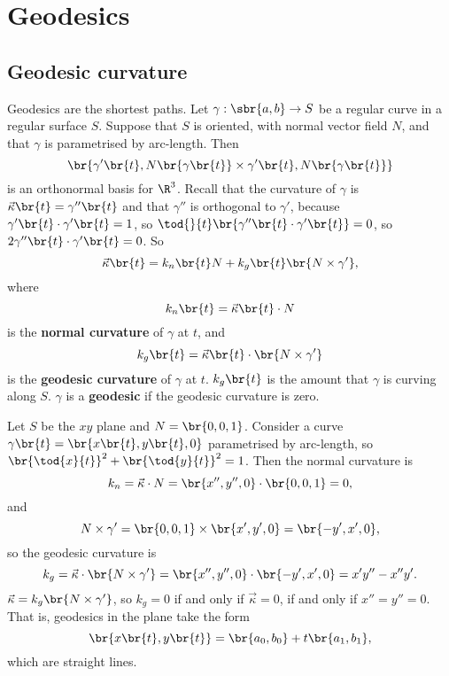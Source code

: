\pagebreak

\section{Geodesics}

\subsection{Geodesic curvature}

Geodesics are the shortest paths. Let $ \gamma : \sbr{a, b} \to S $ be a regular curve in a regular surface $ S $. Suppose that $ S $ is oriented, with normal vector field $ N $, and that $ \gamma $ is parametrised by arc-length. Then
$$ \br{\gamma'\br{t}, N\br{\gamma\br{t}} \times \gamma'\br{t}, N\br{\gamma\br{t}}} $$
is an orthonormal basis for $ \R^3 $. Recall that the curvature of $ \gamma $ is $ \vec{\kappa}\br{t} = \gamma''\br{t} $ and that $ \gamma'' $ is orthogonal to $ \gamma' $, because $ \gamma'\br{t} \cdot \gamma'\br{t} = 1 $, so $ \tod{}{t}\br{\gamma''\br{t} \cdot \gamma'\br{t}} = 0 $, so $ 2\gamma''\br{t} \cdot \gamma'\br{t} = 0 $. So
$$ \vec{\kappa}\br{t} = k_n\br{t}N + k_g\br{t}\br{N \times \gamma'}, $$
where
$$ k_n\br{t} = \vec{\kappa}\br{t} \cdot N $$
is the \textbf{normal curvature} of $ \gamma $ at $ t $, and
$$ k_g\br{t} = \vec{\kappa}\br{t} \cdot \br{N \times \gamma'} $$
is the \textbf{geodesic curvature} of $ \gamma $ at $ t $. $ k_g\br{t} $ is the amount that $ \gamma $ is curving along $ S $. $ \gamma $ is a \textbf{geodesic} if the geodesic curvature is zero.


\begin{example*}
Let $ S $ be the $ xy $ plane and $ N = \br{0, 0, 1} $. Consider a curve $ \gamma\br{t} = \br{x\br{t}, y\br{t}, 0} $ parametrised by arc-length, so $ \br{\tod{x}{t}}^2 + \br{\tod{y}{t}}^2 = 1 $. Then the normal curvature is
$$ k_n = \vec{\kappa} \cdot N = \br{x'', y'', 0} \cdot \br{0, 0, 1} = 0, $$
and
$$ N \times \gamma' = \br{0, 0, 1} \times \br{x', y', 0} = \br{-y', x', 0}, $$
so the geodesic curvature is
$$ k_g = \vec{\kappa} \cdot \br{N \times \gamma'} = \br{x'', y'', 0} \cdot \br{-y', x', 0} = x'y'' - x''y'. $$
$ \vec{\kappa} = k_g\br{N \times \gamma'} $, so $ k_g = 0 $ if and only if $ \vec{\kappa} = 0 $, if and only if $ x'' = y'' = 0 $. That is, geodesics in the plane take the form
$$ \br{x\br{t}, y\br{t}} = \br{a_0, b_0} + t\br{a_1, b_1}, $$
which are straight lines.
\end{example*}

